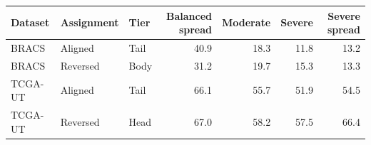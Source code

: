 \begin{tabular}{lllrrrr}
\toprule
Dataset & Assignment & Tier & Balanced spread & Moderate & Severe & Severe spread \\
\midrule
BRACS & Aligned & Tail & 40.9 & 18.3 & 11.8 & 13.2 \\
BRACS & Reversed & Body & 31.2 & 19.7 & 15.3 & 13.3 \\
TCGA-UT & Aligned & Tail & 66.1 & 55.7 & 51.9 & 54.5 \\
TCGA-UT & Reversed & Head & 67.0 & 58.2 & 57.5 & 66.4 \\
\bottomrule
\end{tabular}
